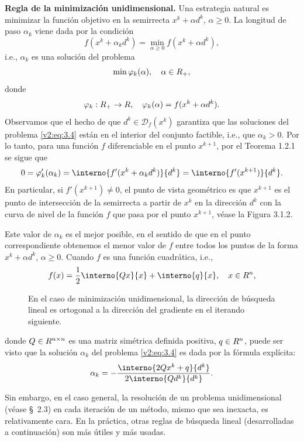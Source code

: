 \textbf{Regla de la minimización unidimensional.} Una estrategia natural es minimizar la función objetivo en la semirrecta $x^k + \alpha d^k$, $\alpha \ge 0$. La longitud de paso $\alpha_k$ viene dada por la condición
\[
    f(x^k + \alpha_k d^k) = \min_{\alpha \ge 0} f(x^k + \alpha d^k),
\]
i.e., $\alpha_k$ es una solución del problema
\begin{equation}
    \min \varphi_k(\alpha), \quad \alpha \in R_+,
    \label{v2:eq:3.4}
\end{equation}
donde
\[
    \varphi_k : R_+ \to R, \quad \varphi_k(\alpha) = f(x^k + \alpha d^k).
\]
Observamos que el hecho de que $d^k \in \mathcal{D}_f(x^k)$ garantiza que las soluciones del problema \eqref{v2:eq:3.4} están en el interior del conjunto factible, i.e., que $\alpha_k > 0$. Por lo tanto, para una función $f$ diferenciable en el punto $x^{k+1}$, por el Teorema 1.2.1 se sigue que
\begin{equation}
    0 = \varphi_k'(\alpha_k) = \interno{f'(x^k + \alpha_k d^k)}{d^k} = \interno{f'(x^{k+1})}{d^k}.
    \label{v2:eq:3.5}
\end{equation}
En particular, si $f'(x^{k+1}) \neq 0$, el punto de vista geométrico es que $x^{k+1}$ es el punto de intersección de la semirrecta a partir de $x^k$ en la dirección $d^k$ con la curva de nivel de la función $f$ que pasa por el punto $x^{k+1}$, véase la Figura 3.1.2.

Este valor de $\alpha_k$ es el mejor posible, en el sentido de que en el punto correspondiente obtenemos el menor valor de $f$ entre todos los puntos de la forma $x^k + \alpha d^k$, $\alpha \ge 0$. Cuando $f$ es una función cuadrática, i.e.,
\[
    f(x) = \frac{1}{2} \interno{Qx}{x} + \interno{q}{x}, \quad x \in \Rn,
\]

\begin{figure}[htpb]
    \centering
    \caption{En el caso de minimización unidimensional, la dirección de búsqueda lineal es ortogonal a la dirección del gradiente en el iterando siguiente.}
    \label{v2:fig:3.1.2}
\end{figure}

donde $Q \in R^{n \times n}$ es una matriz simétrica definida positiva, $q \in R^n$, puede ser visto que la solución $\alpha_k$ del problema \eqref{v2:eq:3.4} es dada por la fórmula explícita:
\[
    \alpha_k = - \frac{\interno{2Qx^k + q}{d^k}}{2\interno{Qd^k}{d^k}}.
\]

Sin embargo, en el caso general, la resolución de un problema unidimensional (véase \S~2.3) en cada iteración de un método, mismo que sea inexacta, es relativamente cara. En la práctica, otras reglas de búsqueda lineal (desarrolladas a continuación) son más útiles y más usadas.


